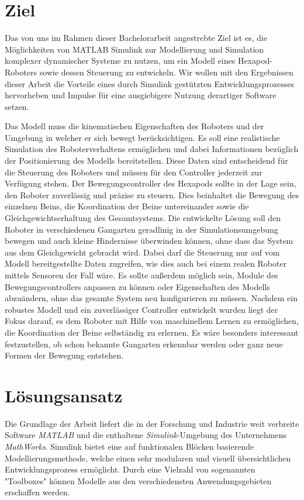 \section{Ziel}
Das von uns im Rahmen dieser Bachelorarbeit angestrebte Ziel ist es, die Möglichkeiten von MATLAB Simulink zur Modellierung und Simulation komplexer dynamischer Systeme zu nutzen, um ein Modell eines Hexapod-Roboters sowie dessen Steuerung zu entwickeln.
Wir wollen mit den Ergebnissen dieser Arbeit die Vorteile eines durch Simulink gestützten Entwicklungsprozesses hervorheben und Impulse für eine ausgiebigere Nutzung derartiger Software setzen.

Das Modell muss die kinematischen Eigenschaften des Roboters und der Umgebung in welcher er sich bewegt berücksichtigen.
Es soll eine realistische Simulation des Roboterverhaltens ermöglichen und dabei Informationen bezüglich der Positionierung des Modells bereitstellen.
Diese Daten sind entscheidend für die Steuerung des Roboters und müssen für den Controller jederzeit zur Verfügung stehen.
Der Bewegungscontroller des Hexapods sollte in der Lage sein, den Roboter zuverlässig und präzise zu steuern.
Dies beinhaltet die Bewegung des einzelnen Beins, die Koordination der Beine untereinander sowie die Gleichgewichtserhaltung des Gesamtsystems.
Die entwickelte Lösung soll den Roboter in verschiedenen Gangarten geradlinig in der Simulationsumgebung bewegen und auch kleine Hindernisse überwinden können, ohne dass das System aus dem Gleichgewicht gebracht wird.
Dabei darf die Steuerung nur auf vom Modell bereitgestellte Daten zugreifen, wie dies auch bei einem realen Roboter mittels Sensoren der Fall wäre.
Es sollte außerdem möglich sein, Module des Bewegungscontrollers anpassen zu können oder Eigenschaften des Modells abzuändern, ohne das gesamte System neu konfigurieren zu müssen.
Nachdem ein robustes Modell und ein zuverlässiger Controller entwickelt wurden liegt der Fokus darauf, es dem Roboter mit Hilfe von maschinellem Lernen zu ermöglichen, die Koordination der Beine selbständig zu erlernen.
Es wäre besonders interessant festzustellen, ob schon bekannte Gangarten erkennbar werden oder ganz neue Formen der Bewegung entstehen.

\section{Lösungsansatz}
Die Grundlage der Arbeit liefert die in der Forschung und Industrie weit verbreite Software \textit{MATLAB\textregistered} und die enthaltene \textit{Simulink}\textregistered-Umgebung des Unternehmens \textit{MathWorks}.
Simulink bietet eine auf funktionalen Blöcken basierende Modellierungsmethode, welche einen sehr modularen und visuell übersichtlichen Entwicklungsprozess ermöglicht.
Durch eine Vielzahl von sogenannten "Toolboxes" können Modelle aus den verschiedensten Anwendungsgebieten erschaffen werden.

